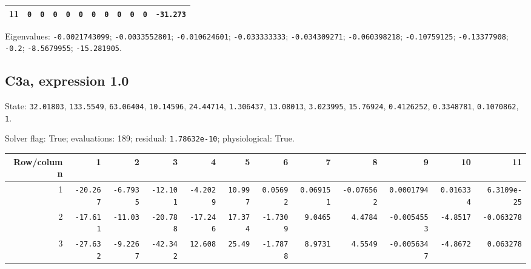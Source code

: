 \begin{landscape}
\begin{tabular}{rrrrrrrrrrrr}
11 & \texttt{0} & \texttt{0} & \texttt{0} & \texttt{0} & \texttt{0} & \texttt{0} & \texttt{0} & \texttt{0} & \texttt{0} & \texttt{0} & \texttt{-31.273} \\

\bottomrule\end{tabular}\par\endgroup

{\scriptsize Eigenvalues: \texttt{-0.0021743099}; \texttt{-0.0033552801}; \texttt{-0.010624601}; \texttt{-0.033333333}; \texttt{-0.034309271}; \texttt{-0.060398218}; \texttt{-0.10759125}; \texttt{-0.13377908}; \texttt{-0.2}; \texttt{-8.5679955}; \texttt{-15.281905}.\par}

\clearpage
\subsection*{C3a, expression 1.0}
{\scriptsize State: \texttt{32.01803}, \texttt{133.5549}, \texttt{63.06404}, \texttt{10.14596}, \texttt{24.44714}, \texttt{1.306437}, \texttt{13.08013}, \texttt{3.023995}, \texttt{15.76924}, \texttt{0.4126252}, \texttt{0.3348781}, \texttt{0.1070862}, \texttt{1}.\par

Solver flag: True; evaluations: 189; residual: \texttt{1.78632e-10}; physiological: True.\par}

\begingroup\scriptsize\setlength{\tabcolsep}{3pt}\centering
\begin{tabular}{rrrrrrrrrrrr}\toprule

Row/column & 1 & 2 & 3 & 4 & 5 & 6 & 7 & 8 & 9 & 10 & 11 \\ \midrule

1 & \texttt{-20.267} & \texttt{-6.7935} & \texttt{-12.101} & \texttt{-4.2029} & \texttt{10.997} & \texttt{0.05692} & \texttt{0.069151} & \texttt{-0.076562} & \texttt{0.0001794} & \texttt{0.016334} & \texttt{6.3109e-25} \\

2 & \texttt{-17.611} & \texttt{-11.03} & \texttt{-20.788} & \texttt{-17.246} & \texttt{17.374} & \texttt{-1.7309} & \texttt{9.0465} & \texttt{4.4784} & \texttt{-0.0054553} & \texttt{-4.8517} & \texttt{-0.063278} \\

3 & \texttt{-27.632} & \texttt{-9.2267} & \texttt{-42.342} & \texttt{12.608} & \texttt{25.49} & \texttt{-1.7878} & \texttt{8.9731} & \texttt{4.5549} & \texttt{-0.0056347} & \texttt{-4.8672} & \texttt{0.063278} \\


\end{tabular}
\end{landscape}
